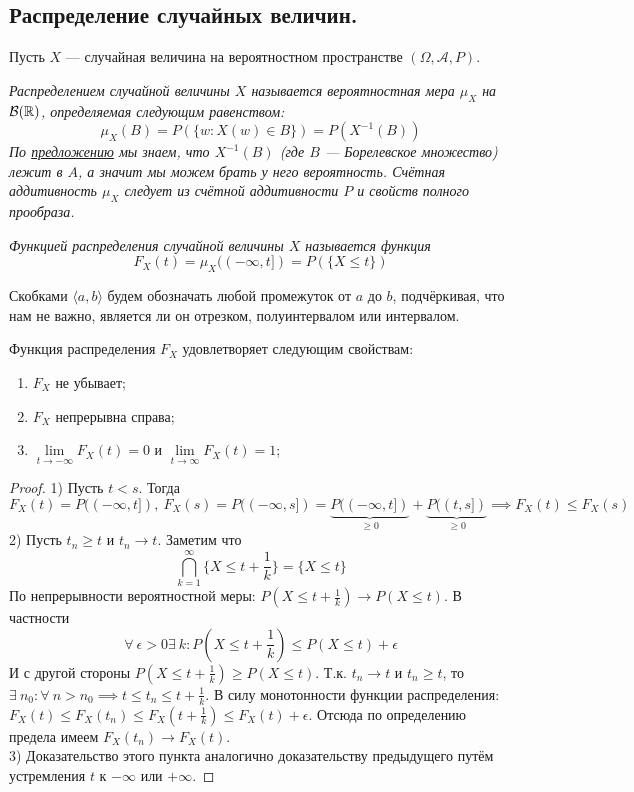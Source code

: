 \subsection{Распределение случайных величин.}
Пусть $X$ --- случайная величина на вероятностном пространстве $(\Omega, \mathcal{A}, P)$.
\begin{definition}
    \it{Распределением} случайной величины $X$ называется вероятностная мера $\mu_X$ на $\mathcal{B}(\mathbb{R})$,
    определяемая следующим равенством:
    \[
        \mu_X(B) = P(\{w \colon X(w) \in B\}) = P(X^{-1}(B))
    \]
    По \hyperref[random_val_for_Borelian]{предложению} мы знаем, что $X^{-1}(B)$ (где $B$ ---
    Борелевское множество) лежит в $A$, а значит мы можем брать у него вероятность. Счётная аддитивность $\mu_X$
    следует из счётной аддитивности $P$ и свойств полного прообраза.
\end{definition}
\begin{definition}
    \it{Функцией распределения} случайной величины $X$ называется функция
    \[
        F_X(t) = \mu_X((-\infty, t]) = P(\{X \leq t\})
    \]
\end{definition}
\begin{designation}
    Скобками $\langle a, b \rangle$ будем обозначать любой промежуток от $a$ до $b$, подчёркивая, что
    нам не важно, является ли он отрезком, полуинтервалом или интервалом.
\end{designation}
\begin{proposal}
    Функция распределения $F_X$ удовлетворяет следующим свойствам:
    \begin{enumerate}
        \item $F_X$ не убывает;
        \item $F_X$ непрерывна справа;
        \item $\lim\limits_{t \to -\infty} F_X(t) = 0$ и $\lim\limits_{t \to \infty} F_X(t) = 1$;
    \end{enumerate}
\end{proposal}
\begin{proof}
    1) Пусть $t < s$. Тогда
    \[
        F_X(t) = P((-\infty, t]), ~
        F_X(s) = P((-\infty, s]) = \underbrace{P((-\infty, t])}_{\geq 0}
        + \underbrace{P((t, s])}_{\geq 0} \implies F_X(t) \leq F_X(s)
    \]
    2) Пусть $t_n \geq t$ и $t_n \to t$. Заметим что
    \[
        \bigcap_{k = 1}^{\infty} \{X \leq t + \frac{1}{k}\} = \{X \leq t\}
    \]
    По непрерывности вероятностной меры: $P\left(X \leq t + \frac{1}{k}\right) \to P(X \leq t)$. В частности
    \[
        \forall ~ \epsilon > 0 \exists ~ k \colon P\left(X \leq t + \frac{1}{k}\right) \leq P(X \leq t) + \epsilon
    \]
    И с другой стороны $P\left(X \leq t + \frac{1}{k}\right) \geq P(X \leq t)$. Т.к. $t_n \to t$ и $t_n \geq t$, то
    $\exists ~ n_0 \colon \forall ~ n > n_0 \implies t \leq t_n \leq t + \frac{1}{k}$. В силу монотонности функции распределения:
    $F_X(t) \leq F_X(t_n) \leq F_X\left( t + \frac{1}{k} \right) \leq F_X(t) + \epsilon$. Отсюда по определению предела
    имеем $F_X(t_n) \to F_X(t)$.\\
    3) Доказательство этого пункта аналогично доказательству предыдущего путём устремления $t$ к $-\infty$ или $+\infty$.
\end{proof}
